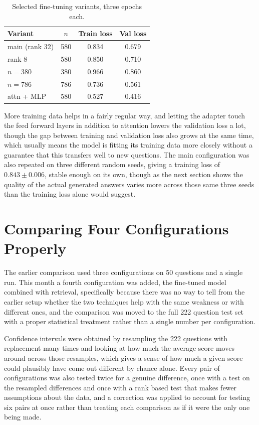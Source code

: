 \documentclass[11pt, a4paper]{article}
\begin{document}
\begin{table}[H]
\centering
\small
\begin{tabular}{lccc}
\toprule
\textbf{Variant} & \textbf{$n$} & \textbf{Train loss} & \textbf{Val loss} \\
\midrule
main (rank 32) & 580 & 0.834 & 0.679 \\
rank 8 & 580 & 0.850 & 0.710 \\
$n=380$ & 380 & 0.966 & 0.860 \\
$n=786$ & 786 & 0.736 & 0.561 \\
attn + MLP & 580 & 0.527 & 0.416 \\
\bottomrule
\end{tabular}
\caption{Selected fine-tuning variants, three epochs each.}
\label{tab:finetune}
\end{table}

More training data helps in a fairly regular way, and letting the adapter touch the feed forward layers in addition to attention lowers the validation loss a lot, though the gap between training and validation loss also grows at the same time, which usually means the model is fitting its training data more closely without a guarantee that this transfers well to new questions. The main configuration was also repeated on three different random seeds, giving a training loss of $0.843 \pm 0.006$, stable enough on its own, though as the next section shows the quality of the actual generated answers varies more across those same three seeds than the training loss alone would suggest.

\section{Comparing Four Configurations Properly}

The earlier comparison used three configurations on 50 questions and a single run. This month a fourth configuration was added, the fine-tuned model combined with retrieval, specifically because there was no way to tell from the earlier setup whether the two techniques help with the same weakness or with different ones, and the comparison was moved to the full 222 question test set with a proper statistical treatment rather than a single number per configuration.

Confidence intervals were obtained by resampling the 222 questions with replacement many times and looking at how much the average score moves around across those resamples, which gives a sense of how much a given score could plausibly have come out different by chance alone. Every pair of configurations was also tested twice for a genuine difference, once with a test on the resampled differences and once with a rank based test that makes fewer assumptions about the data, and a correction was applied to account for testing six pairs at once rather than treating each comparison as if it were the only one being made.
\end{document}
